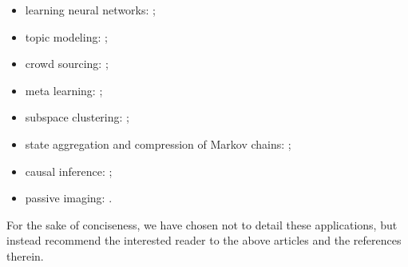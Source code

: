\begin{itemize}
\item { learning neural networks:} \citet{zhong2017recovery,fu2020guaranteed};
\item { topic modeling:} \citet{ke2017new};
\item { crowd sourcing:} \citet{ghosh2011moderates,dalvi2013aggregating,karger2013efficient,zhang2014spectral,karger2014budget};
\item { meta learning:} \citet{kong2020meta,du2020few,tripuraneni2020provable};
\item { subspace clustering:} \citet{eriksson2012high,li2019theory};
\item { state aggregation and compression of Markov chains:} \citet{zhang2020spectral,duan2019state};
\item {causal inference}: \citet{amjad2018robust};
\item { passive imaging:} \citet{lee2018spectral}.
\end{itemize}
%
For the sake of conciseness, we have chosen not to detail these applications,
but instead recommend the interested reader to the above articles and the references therein.




